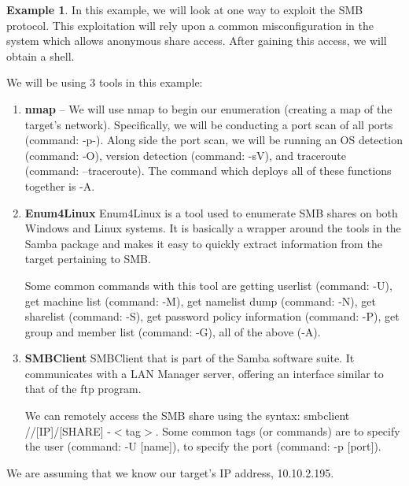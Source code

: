 \documentclass[12pt]{article}
\theoremstyle{definition}
\theoremstyle{definition}
\newtheorem{exmp}{Example}[section]
\begin{document}
        \begin{exmp}
            In this example, we will look at one way to exploit the SMB
            protocol. This exploitation will rely upon a common
            misconfiguration in the system which allows anonymous share access.
            After gaining this access, we will obtain a shell. \par We will be
            using 3 tools in this example:
            \begin{enumerate}
                \item\textbf{nmap} -- We will use nmap to begin our enumeration
                    (creating a map of the target's network). Specifically, we
                    will be conducting a port scan of all ports (command: -p-).
                    Along side the port scan, we will be running an OS
                    detection (command: -O), version detection (command: -sV),
                    and traceroute (command: --traceroute). The command which
                    deploys all of these functions together is -A. 
                \item\textbf{Enum4Linux} Enum4Linux is a tool used to enumerate
                    SMB shares on both Windows and Linux systems. It is
                    basically a wrapper around the tools in the Samba package
                    and makes it easy to quickly extract information from the
                    target pertaining to SMB.\par Some common commands with
                    this tool are getting userlist (command: -U), get machine
                    list (command: -M), get namelist dump (command: -N), get
                    sharelist (command: -S), get password policy information
                    (command: -P), get group and member list (command: -G), all
                    of the above (-A).
                \item\textbf{SMBClient} SMBClient that is part of the Samba
                    software suite. It communicates with a LAN Manager server,
                    offering an interface similar to that of the ftp
                    program.\par We can remotely access the SMB share using the
                    syntax: smbclient //[IP]/[SHARE] -$<$tag$>$. Some common tags
                    (or commands) are to specify the user (command: -U [name]),
                    to specify the port (command: -p [port]).
            \end{enumerate}
            We are assuming that we know our target's IP address, 10.10.2.195.

\end{exmp}
\end{document}
